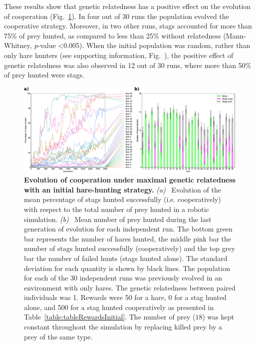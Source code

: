       These results show that genetic relatedness has a positive effect on the evolution of cooperation (Fig.~\ref{fig:graphAltruism}). In four out of 30 runs the population evolved the cooperative strategy. Moreover, in two other runs, stags accounted for more than 75\% of prey hunted, as compared to less than 25\% without relatedness (Mann-Whitney, {\em p}-value \textless 0.005). When the initial population was random, rather than only hare hunters (see supporting information, Fig.~), the positive effect of genetic relatedness was also observed in 12 out of 30 runs, where more than 50\% of prey hunted were stags.

      \begin{figure}[hbtp]
        \centering
          \includegraphics[scale = 1]{fig/ArticleBio1/Fig7.eps}
        \caption{\textbf{Evolution of cooperation under maximal genetic relatedness with an initial hare-hunting strategy.} 
        {\em (a)}~ Evolution of the mean percentage of stags hunted successfully (i.e. cooperatively) with respect to the total number of prey hunted in a robotic simulation. {\em (b)}~ Mean number of prey hunted during the last generation of evolution for each independent run. The bottom green bar represents the number of hares hunted, the middle pink bar the number of stags hunted successfully (cooperatively) and the top grey bar the number of failed hunts (stags hunted alone). The standard deviation for each quantity is shown by black lines. The population for each of the 30 independent runs was previously evolved in an environment with only hares. The genetic relatedness between paired individuals was 1. Rewards were 50 for a hare, 0 for a stag hunted alone, and 500 for a stag hunted cooperatively as presented in Table~\ref{table:tableRewardsInitial}. The number of prey ($18$) was kept constant throughout the simulation by replacing killed prey by a prey of the same type.}
        \label{fig:graphAltruism}
      \end{figure}

